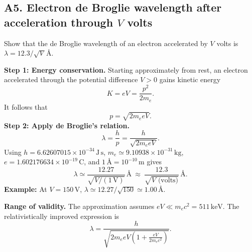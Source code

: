 \documentclass[11pt,a4paper]{article}
\begin{document}
\subsection{A5. Electron de Broglie wavelength after acceleration through $V$ volts}
\begin{questionbox}Show that the de Broglie wavelength of an electron accelerated by $V$ volts is $\lambda=12.3/\sqrt V\,\text{\AA}$.\end{questionbox}
\textbf{Step 1: Energy conservation.} Starting approximately from rest, an electron accelerated through the potential difference $V>0$ gains kinetic energy
\begin{equation}K=eV=\frac{p^2}{2m_e}.
\end{equation}
It follows that
\begin{equation}p=\sqrt{2m_e eV}.
\end{equation}
\textbf{Step 2: Apply de Broglie's relation.}
\begin{equation}
\lambda=\frac hp=\frac{h}{\sqrt{2m_e eV}}.
\end{equation}
Using $h=6.62607015\times10^{-34}\,\mathrm{J\,s}$, $m_e\simeq9.10938\times10^{-31}\,\mathrm{kg}$, $e=1.602176634\times10^{-19}\,\mathrm C$, and $1\,\text{\AA}=10^{-10}\,\mathrm m$ gives
\begin{equation}
\boxed{\lambda\simeq\frac{12.27}{\sqrt{V/(1\,\mathrm V)}}\,\text{\AA}
\ \approx\ \frac{12.3}{\sqrt{V\text{ (volts)}}}\,\text{\AA}.}
\end{equation}
\textbf{Example:} At $V=150\,\mathrm V$, $\lambda\simeq12.27/\sqrt{150}\simeq1.00\,\text{\AA}$.\par
\textbf{Range of validity.} The approximation assumes $eV\ll m_ec^2=511\,\mathrm{keV}$. The relativistically improved expression is
\begin{equation}
\boxed{\lambda=\frac h{\sqrt{2m_e eV\left(1+\frac{eV}{2m_ec^2}\right)}}}.
\end{equation}
\end{document}
